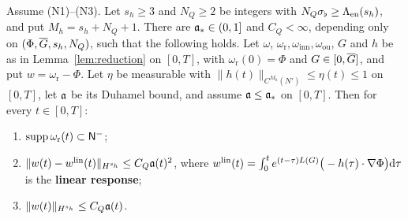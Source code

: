 \begin{theorem}
\label{thm:quiet}
Assume \textup{(N1)}--\textup{(N3)}. Let $s_h\ge3$ and $N_Q\ge2$ be integers with
$N_Q\sigma_\flat\ge\Lambda_{\mathrm{en}}(s_h)$, and put $M_h=s_h+N_Q+1$. There are $\mathfrak{a}_*\in(0,1]$ and
$C_Q<\infty$, depending only on $(\Phi,\overline{G},s_h,N_Q)$, such that the following
holds. Let $\omega$,
$\omega_{\mathrm r},\omega_{\mathrm{inn}},\omega_{\mathrm{ou}}$, $G$ and $h$ be as in
Lemma~\ref{lem:reduction} on $[0,T]$, with $\omega_{\mathrm r}(0)=\Phi$ and
$G\in[0,\overline{G}]$, and put $w=\omega_{\mathrm r}-\Phi$. Let $\eta$ be measurable with
$\|h(t)\|_{C^{M_h}(N')}\le\eta(t)\le1$ on $[0,T]$, let $\mathfrak{a}$ be its Duhamel
bound, and assume $\mathfrak{a}\le\mathfrak{a}_*$ on $[0,T]$. Then for every $t\in[0,T]$:
\begin{enumerate}[label=\textup{(\alph*)}]
\item $\operatorname{supp}\omega_{\mathrm r}(t)\subset\mathsf{N}^{-}$;
\item $\|w(t)-w^{\mathrm{lin}}(t)\|_{H^{s_h}}\le C_Q\mathfrak{a}(t)^2$, where
  $w^{\mathrm{lin}}(t)=\int_0^te^{(t-\tau)L(G)}\big(-h(\tau)\cdot\nabla\Phi\big)\dd\tau$
  is the \textbf{linear response};
\item $\|w(t)\|_{H^{s_h}}\le C_Q\mathfrak{a}(t)$.
\end{enumerate}
\end{theorem}
